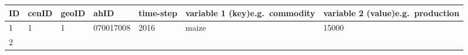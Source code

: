 \documentclass[12pt,]{article}
\begin{document}
\begin{longtable}[]{@{}lllllll@{}}
\toprule
\begin{minipage}[b]{0.07\columnwidth}\raggedright
ID\strut
\end{minipage} & \begin{minipage}[b]{0.07\columnwidth}\raggedright
cenID\strut
\end{minipage} & \begin{minipage}[b]{0.07\columnwidth}\raggedright
geoID\strut
\end{minipage} & \begin{minipage}[b]{0.13\columnwidth}\raggedright
ahID\strut
\end{minipage} & \begin{minipage}[b]{0.13\columnwidth}\raggedright
time-step\strut
\end{minipage} & \begin{minipage}[b]{0.17\columnwidth}\raggedright
variable 1 (key)e.g.~commodity\strut
\end{minipage} & \begin{minipage}[b]{0.17\columnwidth}\raggedright
variable 2 (value)e.g.~production\strut
\end{minipage}\tabularnewline
\midrule
\endhead
\begin{minipage}[t]{0.07\columnwidth}\raggedright
1\strut
\end{minipage} & \begin{minipage}[t]{0.07\columnwidth}\raggedright
1\strut
\end{minipage} & \begin{minipage}[t]{0.07\columnwidth}\raggedright
1\strut
\end{minipage} & \begin{minipage}[t]{0.13\columnwidth}\raggedright
070017008\strut
\end{minipage} & \begin{minipage}[t]{0.13\columnwidth}\raggedright
2016\strut
\end{minipage} & \begin{minipage}[t]{0.17\columnwidth}\raggedright
maize\strut
\end{minipage} & \begin{minipage}[t]{0.17\columnwidth}\raggedright
15000\strut
\end{minipage}\tabularnewline
\begin{minipage}[t]{0.07\columnwidth}\raggedright
2\strut
\end{minipage} & \begin{minipage}[t]{0.07\columnwidth}\raggedright

\end{minipage}
\end{longtable}
\end{document}
